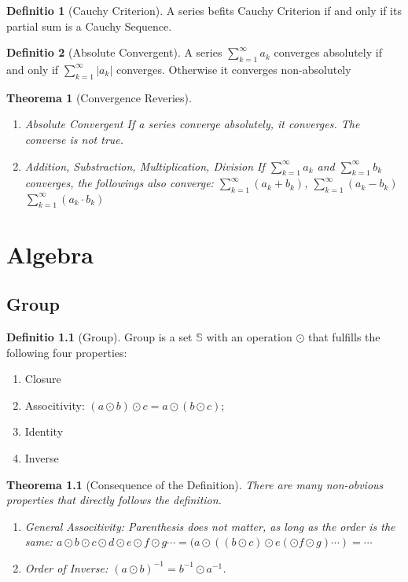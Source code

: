 \documentclass[12pt, a4paper]{report}
\newtheorem{theorem}{Theorema}[section]
\theoremstyle{definition}
\newtheorem{definition}{Definitio}[section]
\theoremstyle{definition}
\theoremstyle{remark}
\begin{document}
\begin{definition}[Cauchy Criterion]A series befits Cauchy Criterion if and only if its partial sum is a Cauchy Sequence. \end{definition}

\begin{definition}[Absolute Convergent] A series $\sum^{\infty}_{k=1}a_k$ converges absolutely if and only if $\sum^{\infty}_{k=1}|a_k|$ converges. Otherwise it converges non-absolutely
\end{definition}
\begin{theorem}[Convergence Reveries]\label{th:ConvergenceReveries}
\ 
\begin{enumerate}
	\item \label{th:ConvergenceReveries:en:absoluteconverge} Absolute Convergent
		If a series converge absolutely, it converges. The converse is not true. 
	\item Addition, Substraction, Multiplication, Division
		If $\sum^{\infty}_{k=1}a_k $ and $\sum^{\infty}_{k=1}b_k$ converges, the followings also converge:
		$\sum^{\infty}_{k=1}(a_k+b_k) $, $\sum^{\infty}_{k=1}(a_k-b_k) $ $\sum^{\infty}_{k=1}(a_k\cdot b_k)$
\end{enumerate}
\end{theorem}




\chapter{Algebra}
\section{Group}

\begin{definition}[Group]
Group is a set $\mathbb{S}$ with an operation $\odot$ that fulfills the following four properties:
\begin{enumerate}
	\item Closure
	\item Associtivity: $(a \odot b) \odot c = a \odot (b \odot c)$;
	\item Identity
	\item Inverse
\end{enumerate}
\end{definition}
\begin{theorem}[Consequence of the Definition]
There are many non-obvious properties that directly follows the definition.
\begin{enumerate}
	\item General Associtivity: Parenthesis does not matter, as long as the order is the same: 
		$a \odot b \odot c \odot d \odot e \odot f \odot g \cdots  = (a \odot ((b \odot c) \odot e (\odot f \odot g)\cdots) = \cdots$
	\item Order of Inverse: $(a \odot b)^{-1}=b^{-1}\odot a^{-1}$.  
\end{enumerate}
\end{theorem}
\end{document}
